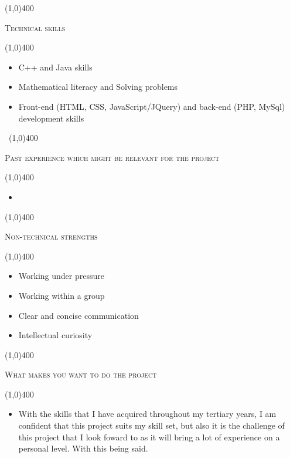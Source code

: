 \documentclass[12pt,a4paper]{report}
\begin{document}
	\begin{center}
	
	\line(1,0){400}\\
	{\scshape\large Technical skills\par}
	\line(1,0){400}\\
	\end{center}
	\begin{itemize}
        \item 
             C++ and Java skills
        \item 
            Mathematical literacy and Solving problems
        \item  
            Front-end (HTML, CSS, JavaScript/JQuery) and back-end (PHP, MySql) development skills 
	\end{itemize}
\newpage
\begin{center}
	\vspace*{-3cm}\
	\line(1,0){400}\\
	{\scshape\large Past experience which might be relevant for the project\par}
	\line(1,0){400}\\
	\end{center}
		\begin{itemize}
\item 

\end{itemize}

	\begin{center}
	
	\line(1,0){400}\\
	{\scshape\large Non-technical strengths\par}
	\line(1,0){400}\\
	\end{center}
	\begin{itemize}
	\item 
		Working under pressure
	\item 
		Working within a group
	\item 
		Clear and concise communication
	\item 
		Intellectual curiosity
	\end{itemize}

\begin{center}
	
	\line(1,0){400}\\
	{\scshape\large What makes you want to do the project\par}
	\line(1,0){400}\\
	\end{center}
	\begin{itemize}
	\item 
		With the skills that I have acquired throughout my tertiary years, I am confident that this project suits my skill set, but also it is the challenge of this project that I look foward to as it will bring a lot of experience on a personal level. With this being said.
	\end{itemize}
\end{document}
